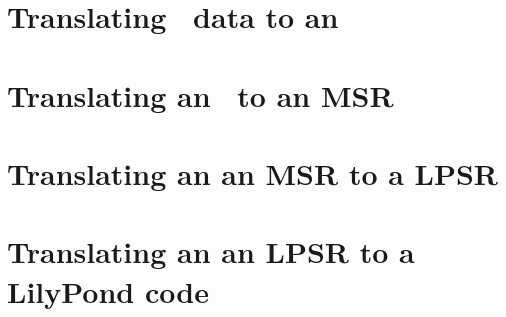 \documentclass[12pt,a4paper]{article}
\begin{document}
\section{Translating \mxml\ data to an \mxmlt}


\section{Translating an \mxmlt\ to an MSR}


\section{Translating an an MSR to a LPSR}


\section{Translating an an LPSR to a LilyPond code}




\pagebreak

\lstlistoflistings

\listoffigures

\tableofcontents


\end{document}
